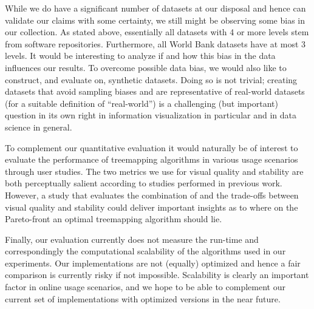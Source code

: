 While we do have a significant number of datasets at our disposal and hence can validate our claims with some certainty, we still might be observing some bias in our collection. As stated above, essentially all datasets with 4 or more levels stem from software repositories. Furthermore, all World Bank datasets have at most 3 levels. It would be interesting to analyze if and how this bias in the data influences our results.
To overcome possible data bias, we would also like to construct, and evaluate on, synthetic datasets. Doing so is not trivial; creating datasets that avoid sampling biases and are representative of real-world datasets (for a suitable definition of ``real-world'') is a challenging (but important) question in its own right in information visualization in particular and in data science in general.

To complement our quantitative evaluation it would naturally be of interest to evaluate the performance of treemapping algorithms in various usage scenarios through user studies. The two metrics we use for visual quality and stability are both perceptually salient according to studies performed in previous work. However, a study that evaluates the combination of and the trade-offs between visual quality and stability could deliver important insights as to where on the Pareto-front an optimal treemapping algorithm should lie.

Finally, our evaluation currently does not measure the run-time and correspondingly the computational scalability of the algorithms used in our experiments. Our implementations are not (equally) optimized and hence a fair comparison is currently risky if not impossible. Scalability is clearly an important factor in online usage scenarios, and we hope to be able to complement our current set of implementations with optimized versions in the near future.

\newpage
